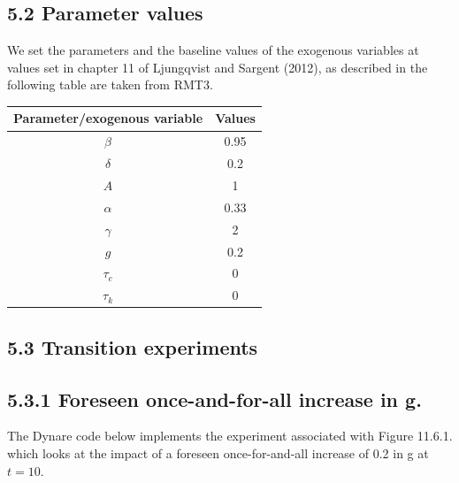 \documentclass[12pt]{article}
\begin{document}
\subsection*{5.2 Parameter values}
We set the parameters and the baseline values of the exogenous variables at values set in chapter 11 of Ljungqvist and Sargent (2012), as described in the following table are taken from RMT3.

\begin{center}
\begin{tabular}{cc}
\hline
Parameter/exogenous variable & Values \\
\hline
$\beta$ & 0.95 \\
$\delta$ & 0.2 \\
$A$ & 1 \\
$\alpha$ & 0.33 \\
$\gamma$ & 2 \\
$g$ & 0.2 \\
$\tau_{c}$ & 0 \\
$\tau_{k}$ & 0 \\
\hline
\end{tabular}
\captionsetup{labelformat=empty}
\captionsetup{hypcap=false}
\end{center}

\subsection*{5.3 Transition experiments}
\subsection*{5.3.1 Foreseen once-and-for-all increase in g.}
The Dynare code below implements the experiment associated with Figure 11.6.1. which looks at the impact of a foreseen once-for-and-all increase of 0.2 in g at $t=10$.


\end{document}

